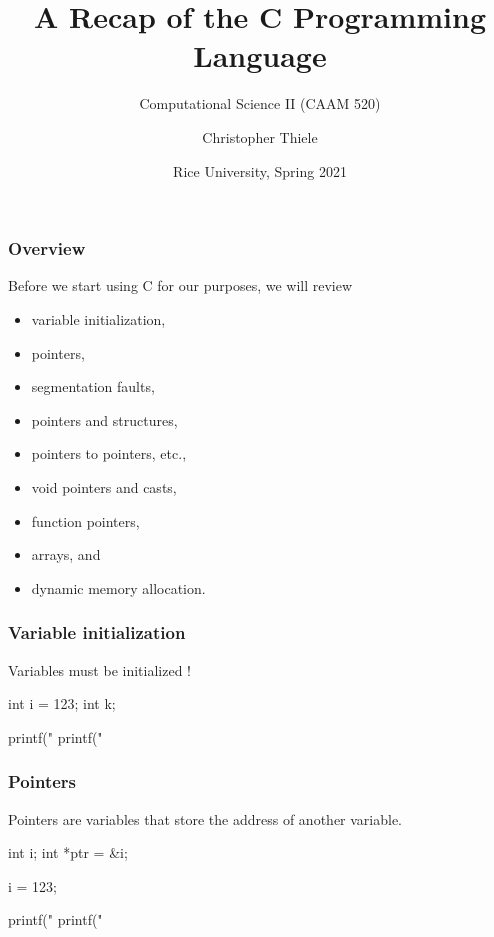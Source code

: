 \documentclass[12pt,t]{beamer}
\let\emph\relax %
\begin{document}
  \title{A Recap of the C Programming Language}
  \subtitle{Computational Science II (CAAM 520)}
  \author{Christopher Thiele}
  \date{Rice University, Spring 2021}

  \begin{frame}
    \titlepage
  \end{frame}


  \begin{frame}
    \frametitle{Overview}

    Before we start using C for our purposes, we will review
    \begin{itemize}
      \item variable initialization,
      \item pointers,
      \item segmentation faults,
      \item pointers and structures,
      \item pointers to pointers, etc.,
      \item void pointers and casts,
      \item function pointers,
      \item arrays, and
      \item dynamic memory allocation.
    \end{itemize}
  \end{frame}

  \begin{frame}[fragile]
    \frametitle{Variable initialization}

    Variables must be initialized \emph{explicitly}!
    \begin{code}
int i = 123;
int k;

printf("%
printf("%
    \end{code}
  \end{frame}

  \begin{frame}[fragile]
    \frametitle{Pointers}

    Pointers are variables that store the address of another variable.
    \begin{code}
int i;
int *ptr = &i;

i = 123;

printf("%
printf("%
    \end{code}
  \end{frame}
\end{document}
